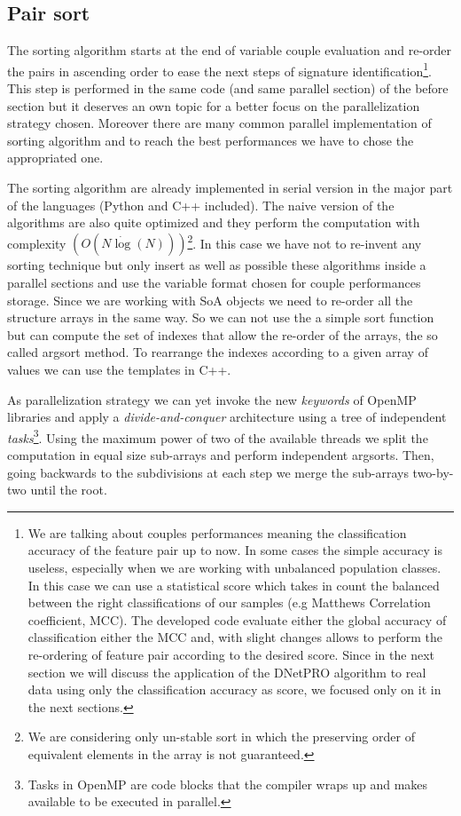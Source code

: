 \documentclass{standalone}
\begin{document}
\subsection[Sorting]{Pair sort}\label{implementation:sort}

The sorting algorithm starts at the end of variable couple evaluation and re-order the pairs in ascending order to ease the next steps of signature identification\footnote{
  We are talking about couples performances meaning the classification accuracy of the feature pair up to now.
  In some cases the simple accuracy is useless, especially when we are working with unbalanced population classes.
  In this case we can use a statistical score which takes in count the balanced between the right classifications of our samples (e.g Matthews Correlation coefficient, MCC).
  The developed code evaluate either the global accuracy of classification either the MCC and, with slight changes allows to perform the re-ordering of feature pair according to the desired score.
  Since in the next section we will discuss the application of the DNetPRO algorithm to real data using only the classification accuracy as score, we focused only on it in the next sections.
}.
This step is performed in the same code (and same parallel section) of the before section but it deserves an own topic for a better focus on the parallelization strategy chosen.
Moreover there are many common parallel implementation of sorting algorithm and to reach the best performances we have to chose the appropriated one.

The sorting algorithm are already implemented in serial version in the major part of the languages (Python and C++ included).
The naive version of the algorithms are also quite optimized and they perform the computation with complexity $(O(N\dot\log(N)))$\footnote{
  We are considering only un-stable sort in which the preserving order of equivalent elements in the array is not guaranteed.
}.
In this case we have not to re-invent any sorting technique but only insert as well as possible these algorithms inside a parallel sections and use the variable format chosen for couple performances storage.
Since we are working with SoA objects we need to re-order all the structure arrays in the same way.
So we can not use the a simple sort function but can compute the set of indexes that allow the re-order of the arrays, the so called \textsf{argsort} method.
To rearrange the indexes according to a given array of values we can use the templates in C++.


As parallelization strategy we can yet invoke the new \emph{keywords} of OpenMP libraries and apply a \emph{divide-and-conquer} architecture using a tree of independent \emph{tasks}\footnote{
  Tasks in OpenMP are code blocks that the compiler wraps up and makes available to be executed in parallel.
}.
Using the maximum power of two of the available threads we split the computation in equal size sub-arrays and perform independent \textsf{argsort}s.
Then, going backwards to the subdivisions at each step we merge the sub-arrays two-by-two until the root.
\end{document}
